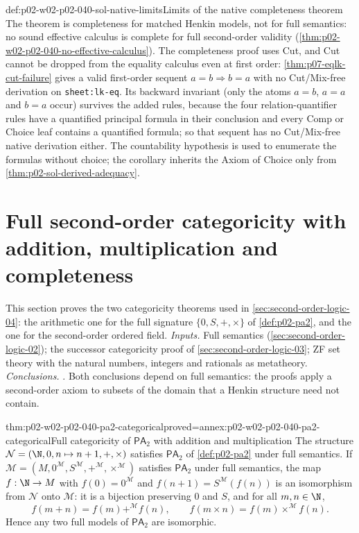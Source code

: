 \begin{hbwarning}{def:p02-w02-p02-040-sol-native-limits}{Limits of the native completeness theorem}
The theorem is completeness for matched Henkin models, not for full
semantics: no sound effective calculus is complete for full second-order
validity (\cref{thm:p02-w02-p02-040-no-effective-calculus}).  The completeness
proof uses Cut, and Cut cannot be dropped from the equality calculus even at
first order: \cref{thm:p07-eqlk-cut-failure} gives a valid first-order
sequent \(a=b\Rightarrow b=a\) with no Cut/Mix-free derivation on
\texttt{sheet:lk-eq}.  Its backward invariant (only the atoms \(a=b\),
\(a=a\) and \(b=a\) occur) survives the added rules, because the four
relation-quantifier rules have a quantified principal formula in their
conclusion and every Comp or Choice leaf contains a quantified formula; so
that sequent has no Cut/Mix-free native derivation either.
The countability hypothesis is used to enumerate the
formulas without choice; the corollary inherits the Axiom of Choice only
from \cref{thm:p02-sol-derived-adequacy}.
\end{hbwarning}

\section{Full second-order categoricity with addition, multiplication and completeness}
\label{sec:p02-w02-p02-040-categoricity}

This section proves the two categoricity theorems used in
\cref{sec:second-order-logic-04}: the arithmetic one for the full signature
\(\{0,S,+,\times\}\) of \cref{def:p02-pa2}, and the one for the second-order
ordered field.  \emph{Inputs.}  Full semantics
(\cref{sec:second-order-logic-02}); the successor categoricity proof of
\cref{sec:second-order-logic-03}; ZF set theory with the natural numbers,
integers and rationals as metatheory.  \emph{Conclusions.}
.
Both conclusions depend on full semantics: the proofs apply a second-order
axiom to subsets of the domain that a Henkin structure need not contain.

\begin{hbtheorem}{thm:p02-w02-p02-040-pa2-categorical}{proved=annex:p02-w02-p02-040-pa2-categorical}{Full categoricity of \(\mathsf{PA}_2\) with addition and multiplication}
The structure \(\mathcal N=(\N,0,n\mapsto n+1,+,\times)\) satisfies
\(\mathsf{PA}_2\) of \cref{def:p02-pa2} under full semantics.  If
\(\mathcal M=(M,0^{\mathcal M},S^{\mathcal M},+^{\mathcal M},\times^{\mathcal M})\)
satisfies \(\mathsf{PA}_2\) under full semantics, the map
\(f:\N\to M\) with \(f(0)=0^{\mathcal M}\) and
\(f(n+1)=S^{\mathcal M}(f(n))\) is an isomorphism from \(\mathcal N\) onto
\(\mathcal M\): it is a bijection preserving \(0\) and \(S\), and for all
\(m,n\in\N\),
\[
 f(m+n)=f(m)+^{\mathcal M}f(n),\qquad
 f(m\times n)=f(m)\times^{\mathcal M}f(n).
\]
Hence any two full models of \(\mathsf{PA}_2\) are isomorphic.
\end{hbtheorem}

